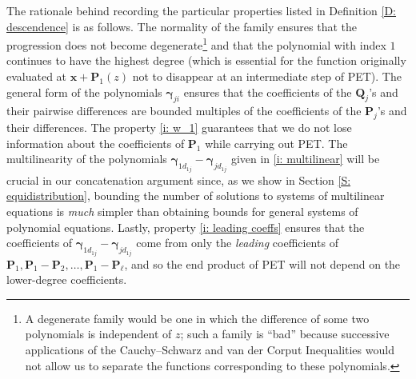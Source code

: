 \documentclass[11pt]{amsart}
\theoremstyle{definition}
\newcommand{\p}{{\textbf{P}}}
\newcommand{\q}{{\textbf{Q}}}
\newcommand{\bx}{{\textbf{x}}}
\newcommand{\bgamma}{{\boldsymbol{\gamma}}}
\begin{document}
            The rationale behind recording the particular properties listed in Definition \ref{D: descendence} is as follows. The normality of the family ensures that the progression does not become degenerate\footnote{A degenerate family would be one in which the difference of some two polynomials is independent of $z$; such a family is ``bad'' because successive applications of the Cauchy--Schwarz and van der Corput Inequalities would not allow us to separate the functions corresponding to these polynomials.} and that the polynomial with index $1$ continues to have the highest degree (which is essential for the function originally evaluated at $\bx + \p_1(z)$ not to disappear at an intermediate step of PET). 
            The general form of the polynomials $\bgamma_{ji}$ ensures that the coefficients of the $\q_j$'s and their pairwise differences are bounded multiples of the coefficients of the $\p_j$'s and their differences. The property \eqref{i: w_1} guarantees that we do not lose information about the coefficients of $\p_1$ while carrying out PET.
            The multilinearity of the polynomials $\bgamma_{1d_{1j}}-\bgamma_{jd_{1j}}$ given in \eqref{i: multilinear} will be crucial in our concatenation argument since, as we show in Section \ref{S: equidistribution}, bounding the number of solutions to systems of multilinear equations is \textit{much} simpler than obtaining bounds for general systems of polynomial equations. Lastly, property \eqref{i: leading coeffs} ensures that the coefficients of $\bgamma_{1d_{1j}}-\bgamma_{jd_{1j}}$ come from only the \textit{leading} coefficients of $\p_1, \p_1-\p_2, \ldots, \p_1-\p_\ell$, and so the end product of PET will not depend on the lower-degree coefficients.
\end{document}
